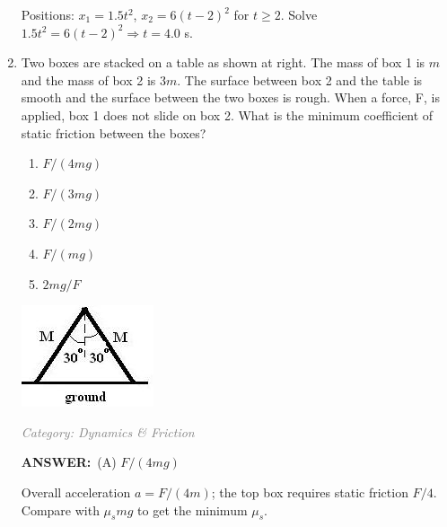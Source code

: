 \documentclass[12pt, a4paper]{article}
\makeatletter
\newcommand{\finalanswer}[1]{\textbf{ANSWER:}~#1}
\newif\if@categoryprinted
\newcommand{\category}[1]{\if@categoryprinted\relax\else\textit{\textcolor{gray}{Category: #1}}\global\@categoryprintedtrue\fi}
\newcommand{\tags}[1]{}
\makeatother
\begin{document}
\begin{CJK*}{UTF8}{gbsn}
\begin{enumerate}[itemsep=1.0em, topsep=0.6em]
\begin{solutionbox}
Positions: $x_1=1.5t^2$, $x_2=6(t-2)^2$ for $t\ge2$. Solve $1.5t^2=6(t-2)^2 \Rightarrow t=4.0$ s.
\end{solutionbox}

\item \label{prob:36}
\noindent\begin{minipage}[t]{0.6\linewidth}
\vspace{0pt}
Two boxes are stacked on a table as shown at right. The mass of box 1 is $m$ and the mass of box 2 is $3m$. The surface between box 2 and the table is smooth and the surface between the two boxes is rough. When a force, F, is applied, box 1 does not slide on box 2. What is the minimum coefficient of static friction between the boxes?
\begin{enumerate}[label=(\Alph*)]
    \item $F/(4mg)$
    \item $F/(3mg)$
    \item $F/(2mg)$
    \item $F/(mg)$
    \item $2mg/F$
\end{enumerate}
\end{minipage}%
\hfill
\begin{minipage}[t]{0.35\linewidth}
\vspace{0pt}
\centering
\includegraphics[width=\linewidth]{Problem_38_Figure.png}
\end{minipage}

\category{Dynamics \& Friction} \tags{}
\begin{answerbox}
\finalanswer{(A) $F/(4mg)$}
\end{answerbox}
\begin{insightbox}
Overall acceleration $a=F/(4m)$; the top box requires static friction $F/4$. Compare with $\mu_s mg$ to get the minimum $\mu_s$.
\end{insightbox}
\begin{solutionbox}


\end{solutionbox}
\end{enumerate}
\end{CJK*}
\end{document}
